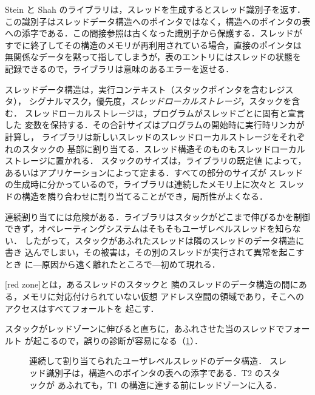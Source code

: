 \documentclass[../main.tex]{subfiles}
\begin{document}
Stein と Shah のライブラリは，スレッドを生成するとスレッド識別子を返す．
この識別子はスレッドデータ構造へのポインタではなく，構造へのポインタの表
への添字である．この間接参照は古くなった識別子から保護する．スレッドが
すでに終了してその構造のメモリが再利用されている場合，直接のポインタは
無関係なデータを黙って指してしまうが，表のエントリにはスレッドの状態を
記録できるので，ライブラリは意味のあるエラーを返せる．

スレッドデータ構造は，実行コンテキスト（スタックポインタを含むレジスタ），
シグナルマスク，優先度，\emph{スレッドローカルストレージ}，スタックを含む．
スレッドローカルストレージは，プログラムがスレッドごとに固有と宣言した
変数を保持する．その合計サイズはプログラムの開始時に実行時リンカが計算し，
ライブラリは新しいスレッドのスレッドローカルストレージをそれぞれのスタックの
基部に割り当てる．スレッド構造そのものもスレッドローカルストレージに置かれる．%
スタックのサイズは，ライブラリの既定値
によって，あるいはアプリケーションによって定まる．すべての部分のサイズが
スレッドの生成時に分かっているので，ライブラリは連続したメモリ上に次々と
スレッドの構造を隣り合わせに割り当てることができ，局所性がよくなる．

連続割り当てには危険がある．ライブラリはスタックがどこまで伸びるかを制御
できず，オペレーティングシステムはそもそもユーザレベルスレッドを知らない．
したがって，スタックがあふれたスレッドは隣のスレッドのデータ構造に書き
込んでしまい，その被害は，その別のスレッドが実行されて異常を起こすとき
に---原因から遠く離れたところで---初めて現れる．

\begin{definition}[レッドゾーン]
  [red zone]とは，あるスレッドのスタックと
  隣のスレッドのデータ構造の間にある，メモリに対応付けられていない仮想
  アドレス空間の領域であり，そこへのアクセスはすべてフォールトを
  起こす．
\end{definition}

スタックがレッドゾーンに伸びると直ちに，あふれさせた当のスレッドでフォールト
が起こるので，誤りの診断が容易になる（\cref{fig:l05-ult-layout}）．

\begin{figure}[htbp]
  \centering
  
  \caption{連続して割り当てられたユーザレベルスレッドのデータ構造．
    スレッド識別子は，構造へのポインタの表への添字である．T2 のスタックが
    あふれても，T1 の構造に達する前にレッドゾーンに入る．}
  \label{fig:l05-ult-layout}
\end{figure}
\end{document}

